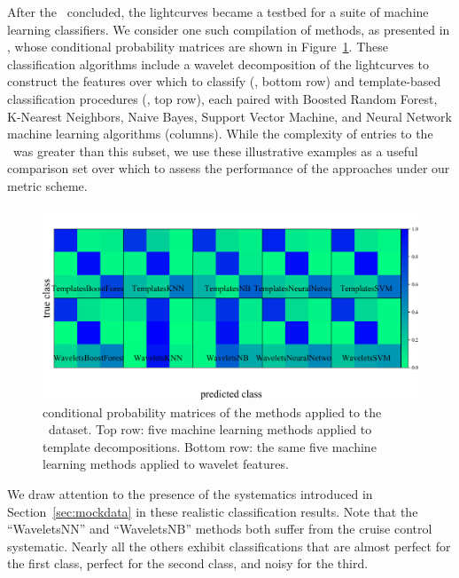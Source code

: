 After the \snphotcc\ concluded, the lightcurves became a testbed for a suite of machine learning classifiers.
We consider one such compilation of methods, as presented in \citet{lochner_photometric_2016}, whose conditional probability matrices are shown in Figure~\ref{fig:snphotcc_cm}.
These classification algorithms include a wavelet decomposition of the lightcurves to construct the features over which to classify (\citet{newling_statistical_2011}, bottom row) and template-based classification procedures (\citet{sako_photometric_2011}, top row), each paired with Boosted Random Forest, K-Nearest Neighbors, Naive Bayes, Support Vector Machine, and Neural Network machine learning algorithms (columns).
While the complexity of entries to the \snphotcc\ was greater than this subset, we use these illustrative examples as a useful comparison set over which to assess the performance of the approaches under our metric scheme.

\begin{figure}
	\begin{center}
    \includegraphics[width=\textwidth]{./fig/all_snphotcc_cm.png}
		\caption{conditional probability matrices of the \citet{lochner_photometric_2016} methods applied to the \snphotcc\ dataset.
    Top row: five machine learning methods applied to template decompositions.
    Bottom row: the same five machine learning methods applied to wavelet features.}
		\label{fig:snphotcc_cm}
	\end{center}
\end{figure}

We draw attention to the presence of the systematics introduced in Section~\ref{sec:mockdata} in these realistic classification results.
Note that the ``WaveletsNN'' and ``WaveletsNB'' methods both suffer from the cruise control systematic.
Nearly all the others exhibit classifications that are almost perfect for the first class, perfect for the second class, and noisy for the third.

